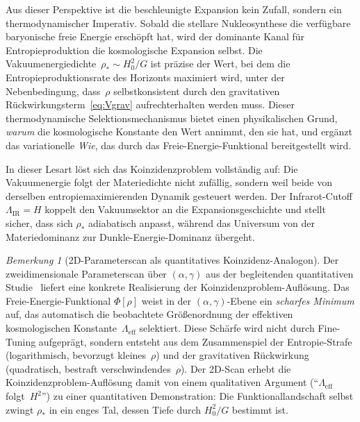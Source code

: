 \documentclass[12pt,a4paper]{article}
\theoremstyle{definition}
\theoremstyle{plain}
\theoremstyle{remark}
\newtheorem{remark}[definition]{Bemerkung}
\newcommand{\LIR}{\Lambda_{\mathrm{IR}}}
\begin{document}
Aus dieser Perspektive ist die beschleunigte Expansion kein Zufall, sondern ein thermodynamischer Imperativ. Sobald die stellare Nukleosynthese die verf\"ugbare baryonische freie Energie ersch\"opft hat, wird der dominante Kanal f\"ur Entropieproduktion die kosmologische Expansion selbst. Die Vakuumenergiedichte~$\rho_\ast \sim H_0^2/G$ ist pr\"azise der Wert, bei dem die Entropieproduktionsrate des Horizonts maximiert wird, unter der Nebenbedingung, dass~$\rho$ selbstkonsistent durch den gravitativen R\"uckwirkungsterm~\eqref{eq:Vgrav} aufrechterhalten werden muss. Dieser thermodynamische Selektionsmechanismus bietet einen physikalischen Grund, \emph{warum} die kosmologische Konstante den Wert annimmt, den sie hat, und erg\"anzt das variationelle \emph{Wie}, das durch das Freie-Energie-Funktional bereitgestellt wird.

In dieser Lesart l\"ost sich das Koinzidenzproblem vollst\"andig auf: Die Vakuumenergie folgt der Materiedichte nicht zuf\"allig, sondern weil beide von derselben entropiemaximierenden Dynamik gesteuert werden. Der Infrarot-Cutoff $\LIR = H$ koppelt den Vakuumsektor an die Expansionsgeschichte und stellt sicher, dass sich $\rho_\ast$ adiabatisch anpasst, w\"ahrend das Universum von der Materiedominanz zur Dunkle-Energie-Dominanz \"ubergeht.

\begin{remark}[2D-Parameterscan als quantitatives Koinzidenz-Analogon]
\label{rem:2d-scan-coincidence}
Der zweidimensionale Parameterscan \"uber $(\alpha, \gamma)$ aus der
begleitenden quantitativen Studie~\cite{FST-Unified2026} liefert eine
konkrete Realisierung der Koinzidenzproblem-Aufl\"osung.
Das Freie-Energie-Funktional $\Phi[\rho]$ weist in der
$(\alpha, \gamma)$-Ebene ein \emph{scharfes Minimum} auf, das
automatisch die beobachtete Gr\"o\ss enordnung der effektiven
kosmologischen Konstante~$\Lambda_{\mathrm{eff}}$ selektiert.
Diese Sch\"arfe wird nicht durch Fine-Tuning aufgepr\"agt, sondern
entsteht aus dem Zusammenspiel der Entropie-Strafe (logarithmisch,
bevorzugt kleines~$\rho$) und der gravitativen R\"uckwirkung
(quadratisch, bestraft verschwindendes~$\rho$). Der 2D-Scan erhebt
die Koinzidenzproblem-Aufl\"osung damit von einem qualitativen
Argument (``$\Lambda_{\mathrm{eff}}$ folgt~$H^2$'') zu einer
quantitativen Demonstration: Die Funktionallandschaft selbst zwingt
$\rho_\ast$ in ein enges Tal, dessen Tiefe durch $H_0^2/G$
bestimmt ist.
\end{remark}
\end{document}
